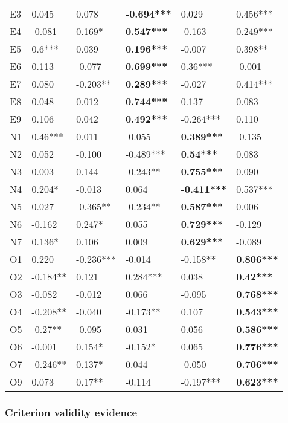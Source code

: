 \documentclass[,man,floatsintext]{apa6}
\theoremstyle{definition}
\theoremstyle{definition}
\theoremstyle{definition}
\theoremstyle{remark}
\begin{document}
\begin{table}[ht]
\begin{tabular}{llllll}
  E3 & 0.045 & 0.078 & \textbf{-0.694***} & 0.029 & 0.456*** \\ 
  E4 & -0.081 & 0.169* & \textbf{0.547***} & -0.163 & 0.249*** \\ 
  E5 & 0.6*** & 0.039 & \textbf{0.196***} & -0.007 & 0.398** \\ 
  E6 & 0.113 & -0.077 & \textbf{0.699***} & 0.36*** & -0.001 \\ 
  E7 & 0.080 & -0.203** & \textbf{0.289***} & -0.027 & 0.414*** \\ 
  E8 & 0.048 & 0.012 & \textbf{0.744***} & 0.137 & 0.083 \\ 
  E9 & 0.106 & 0.042 & \textbf{0.492***} & -0.264*** & 0.110 \\ 
  N1 & 0.46*** & 0.011 & -0.055 & \textbf{0.389***} & -0.135 \\ 
  N2 & 0.052 & -0.100 & -0.489*** & \textbf{0.54***} & 0.083 \\ 
  N3 & 0.003 & 0.144 & -0.243** & \textbf{0.755***} & 0.090 \\ 
  N4 & 0.204* & -0.013 & 0.064 & \textbf{-0.411***} & 0.537*** \\ 
  N5 & 0.027 & -0.365** & -0.234** & \textbf{0.587***} & 0.006 \\ 
  N6 & -0.162 & 0.247* & 0.055 & \textbf{0.729***} & -0.129 \\ 
  N7 & 0.136* & 0.106 & 0.009 & \textbf{0.629***} & -0.089 \\ 
  O1 & 0.220 & -0.236*** & -0.014 & -0.158** & \textbf{0.806***} \\ 
  O2 & -0.184** & 0.121 & 0.284*** & 0.038 & \textbf{0.42***} \\ 
  O3 & -0.082 & -0.012 & 0.066 & -0.095 & \textbf{0.768***} \\ 
  O4 & -0.208** & -0.040 & -0.173** & 0.107 & \textbf{0.543***} \\ 
  O5 & -0.27** & -0.095 & 0.031 & 0.056 & \textbf{0.586***} \\ 
  O6 & -0.001 & 0.154* & -0.152* & 0.065 & \textbf{0.776***} \\ 
  O7 & -0.246** & 0.137* & 0.044 & -0.050 & \textbf{0.706***} \\ 
  O9 & 0.073 & 0.17** & -0.114 & -0.197*** & \textbf{0.623***} \\ 
   \hline
\end{tabular}
\endgroup
\end{table}

\hypertarget{criterion-validity-evidence-1}{%
\subsubsection{Criterion validity
evidence}\label{criterion-validity-evidence-1}}
\end{document}
